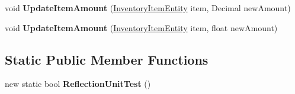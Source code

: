 \begin{DoxyCompactItemize}
\item 
\hypertarget{class_s_e_mod_a_p_i_internal_1_1_a_p_i_1_1_entity_1_1_inventory_entity_a7c9801a55aca44e4328fd38ae6e74bea}{}void {\bfseries Update\+Item\+Amount} (\hyperlink{class_s_e_mod_a_p_i_internal_1_1_a_p_i_1_1_entity_1_1_inventory_item_entity}{Inventory\+Item\+Entity} item, Decimal new\+Amount)\label{class_s_e_mod_a_p_i_internal_1_1_a_p_i_1_1_entity_1_1_inventory_entity_a7c9801a55aca44e4328fd38ae6e74bea}

\item 
\hypertarget{class_s_e_mod_a_p_i_internal_1_1_a_p_i_1_1_entity_1_1_inventory_entity_a1f0352a69334990cbb3ec046771331d0}{}void {\bfseries Update\+Item\+Amount} (\hyperlink{class_s_e_mod_a_p_i_internal_1_1_a_p_i_1_1_entity_1_1_inventory_item_entity}{Inventory\+Item\+Entity} item, float new\+Amount)\label{class_s_e_mod_a_p_i_internal_1_1_a_p_i_1_1_entity_1_1_inventory_entity_a1f0352a69334990cbb3ec046771331d0}

\end{DoxyCompactItemize}
\subsection*{Static Public Member Functions}
\begin{DoxyCompactItemize}
\item 
\hypertarget{class_s_e_mod_a_p_i_internal_1_1_a_p_i_1_1_entity_1_1_inventory_entity_ab4d253c01f9857941b5624808aee3fcd}{}new static bool {\bfseries Reflection\+Unit\+Test} ()\label{class_s_e_mod_a_p_i_internal_1_1_a_p_i_1_1_entity_1_1_inventory_entity_ab4d253c01f9857941b5624808aee3fcd}

\end{DoxyCompactItemize}
